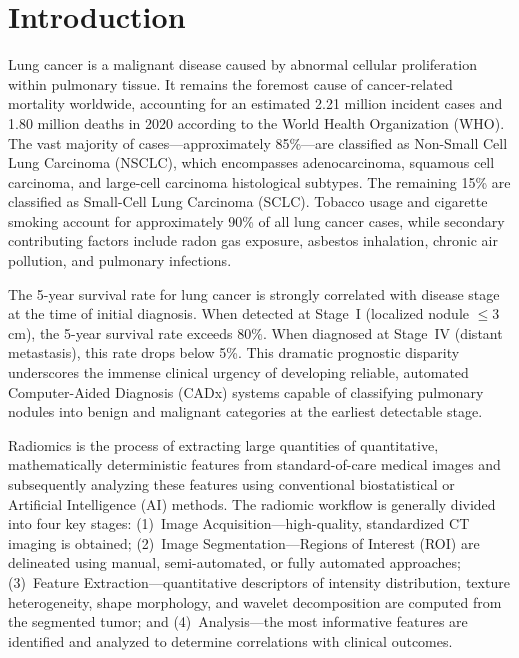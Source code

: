 \documentclass[AMA,STIX1COL]{WileyNJD-v2}
\begin{document}
\section{Introduction}\label{sec1}

Lung cancer is a malignant disease caused by abnormal cellular proliferation within pulmonary tissue. It remains the foremost cause of cancer-related mortality worldwide, accounting for an estimated 2.21 million incident cases and 1.80 million deaths in 2020 according to the World Health Organization (WHO)\cite{lambin2012radiomics}. The vast majority of cases---approximately 85\%---are classified as Non-Small Cell Lung Carcinoma (NSCLC), which encompasses adenocarcinoma, squamous cell carcinoma, and large-cell carcinoma histological subtypes. The remaining 15\% are classified as Small-Cell Lung Carcinoma (SCLC). Tobacco usage and cigarette smoking account for approximately 90\% of all lung cancer cases, while secondary contributing factors include radon gas exposure, asbestos inhalation, chronic air pollution, and pulmonary infections.

The 5-year survival rate for lung cancer is strongly correlated with disease stage at the time of initial diagnosis. When detected at Stage~I (localized nodule $\leq$3\,cm), the 5-year survival rate exceeds 80\%. When diagnosed at Stage~IV (distant metastasis), this rate drops below 5\%. This dramatic prognostic disparity underscores the immense clinical urgency of developing reliable, automated Computer-Aided Diagnosis (CADx) systems capable of classifying pulmonary nodules into benign and malignant categories at the earliest detectable stage.

Radiomics is the process of extracting large quantities of quantitative, mathematically deterministic features from standard-of-care medical images and subsequently analyzing these features using conventional biostatistical or Artificial Intelligence (AI) methods\cite{lambin2012radiomics}. The radiomic workflow is generally divided into four key stages: (1)~Image Acquisition---high-quality, standardized CT imaging is obtained; (2)~Image Segmentation---Regions of Interest (ROI) are delineated using manual, semi-automated, or fully automated approaches\cite{zhang2023radiomics}; (3)~Feature Extraction---quantitative descriptors of intensity distribution, texture heterogeneity, shape morphology, and wavelet decomposition are computed from the segmented tumor; and (4)~Analysis---the most informative features are identified and analyzed to determine correlations with clinical outcomes.
\end{document}
